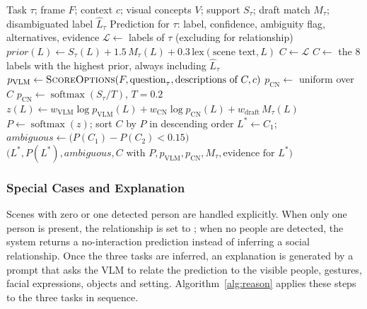 \begin{algorithm}[H]
\caption{Inference of One Task with Log-Linear Fusion}
\label{alg:infertask}
\begin{algorithmic}[1]
\Require Task $\tau$; frame $F$; context $c$; visual concepts $V$; support $S_\tau$; draft match $M_\tau$; disambiguated label $\hat{L}_\tau$
\Ensure Prediction for $\tau$: label, confidence, ambiguity flag, alternatives, evidence
\State $\mathcal{L} \gets$ labels of $\tau$ (excluding  for relationship)
  \State $\mathit{prior}(L) \gets S_\tau(L) + 1.5\, M_\tau(L) + 0.3\, \mathrm{lex}(\text{scene text}, L)$
\EndFor
{}
  \State $C \gets \mathcal{L}$ 
\Else
  \State $C \gets$ the 8 labels with the highest prior, always including $\hat{L}_\tau$
\EndIf
\State $p_{\text{VLM}} \gets \textsc{ScoreOptions}(F, \text{question}_\tau, \text{descriptions of } C, c)$ 
  \State $p_{\text{CN}} \gets$ uniform over $C$
\Else
  \State $p_{\text{CN}} \gets \operatorname{softmax}(S_\tau / T)$, $T = 0.2$
\EndIf
{}
  \State $z(L) \gets w_{\text{VLM}} \log p_{\text{VLM}}(L) + w_{\text{CN}} \log p_{\text{CN}}(L) + w_{\text{draft}}\, M_\tau(L)$
\EndFor
\State $P \gets \operatorname{softmax}(z)$; sort $C$ by $P$ in descending order
\State $L^* \gets C_1$;\; $\mathit{ambiguous} \gets \big(P(C_1) - P(C_2) < 0.15\big)$
\State \Return $\big(L^*, P(L^*), \mathit{ambiguous}, C \text{ with } P, p_{\text{VLM}}, p_{\text{CN}}, M_\tau, \text{evidence for } L^*\big)$
\end{algorithmic}
\end{algorithm}

\subsubsection{Special Cases and Explanation}
Scenes with zero or one detected person are handled explicitly. When only one person is present, the relationship is set to ; when no people are detected, the system returns a no-interaction prediction instead of inferring a social relationship. Once the three tasks are inferred, an explanation is generated by a prompt that asks the VLM to relate the prediction to the visible people, gestures, facial expressions, objects and setting. Algorithm~\ref{alg:reason} applies these steps to the three tasks in sequence.

